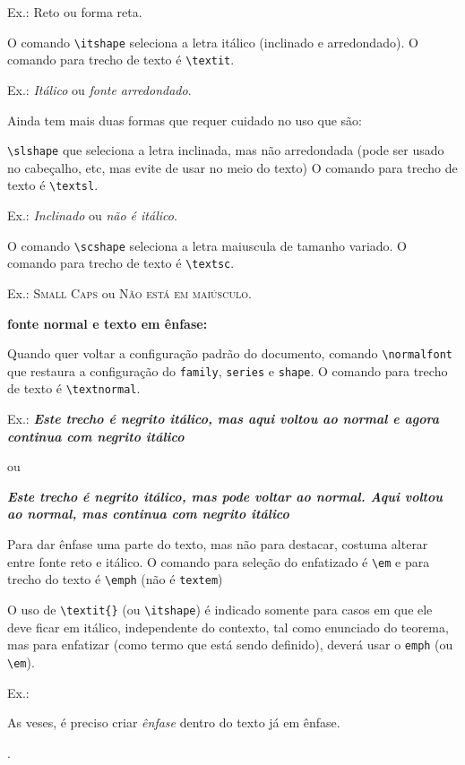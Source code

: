\documentclass[12pt,a4paper]{article}
\begin{document}
Ex.: \textup{Reto} ou {\upshape forma reta}.

O comando \verb|\itshape| seleciona a letra itálico (inclinado e arredondado).
O comando para trecho de texto é \verb+\textit+.

Ex.: \textit{Itálico} ou {\itshape fonte arredondado}.

Ainda tem mais duas formas que requer cuidado no uso que são:

\verb|\slshape| que seleciona a letra inclinada, mas não arredondada
(pode ser usado no cabeçalho, etc, mas evite de usar no meio do texto)
O comando para trecho de texto é \verb+\textsl+.

Ex.: \textsl{Inclinado} ou {\slshape não é itálico}.

O comando \verb|\scshape| seleciona a letra maiuscula de tamanho variado.
O comando para trecho de texto é \verb+\textsc+.

Ex.: \textsc{Small Caps} ou {\scshape Não está em maiúsculo}.

{\bfseries fonte normal e texto em ênfase:}

Quando quer voltar a configuração padrão do documento, 
comando \verb|\normalfont| que restaura a configuração do \verb|family|, \verb|series| e \verb|shape|. 
O comando para trecho de texto é \verb+\textnormal+.

Ex.:
{\bfseries \itshape Este trecho é negrito itálico, 
mas \textnormal{aqui voltou ao normal} e 
agora continua com negrito itálico}

ou 

{\bfseries \itshape Este trecho é negrito itálico, mas pode voltar 
ao normal.
{\normalfont Aqui voltou ao normal}, 
mas continua com negrito itálico}
 

Para dar ênfase uma parte do texto, mas não para destacar, 
costuma alterar entre fonte reto e itálico.
O comando para seleção do enfatizado é \verb|\em| e para trecho do texto 
é \verb+\emph+ (não é \verb+textem+)

O uso de \verb+\textit{}+ (ou \verb|\itshape|) é indicado somente 
para casos em que ele deve ficar em itálico, independente do contexto, 
tal como enunciado do teorema, mas para enfatizar 
(como termo que está sendo definido), deverá usar o \verb+emph+ 
(ou \verb|\em|).

Ex.: 
\begin{em}
  As veses, é preciso criar \emph{ênfase} dentro do texto já em ênfase. 
\end{em}.

\
\end{document}
